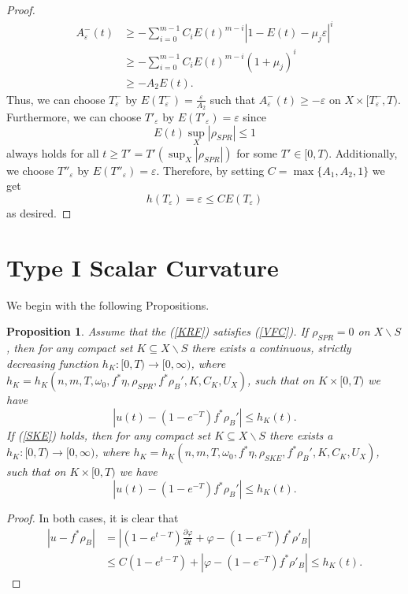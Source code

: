 \documentclass[12pt]{article}
\newtheorem{proposition}[theorem]{Proposition}
\numberwithin{equation}{section}
\renewcommand{\d}{\partial}
\newcommand{\e}{\varepsilon}
\begin{document}
\begin{proof}
\begin{align*}
    A_{\e}^{-}(t) & \geq -\sum_{i=0}^{m-1} C_i E(t)^{m-i}|1-E(t)-\mu_j\e|^i\\
    &\geq - \sum_{i=0}^{m-1} C_i E(t)^{m-i} (1+\mu_j)^i\\
    &\geq - A_2 E(t).
\end{align*}
Thus, we can choose $T^-_{\e}$ by $E(T^-_{\e}) = \frac{\e}{A_2}$ such that $A^-_{\e}(t) \geq -\e$ on $X \times [T^-_{\e},T)$.\\
Furthermore, we can choose $T'_{\e}$ by $E(T'_{\e}) = \e$ since
\begin{equation*}
    E(t) \sup_{X} |\rho_{SPR}| \leq 1
\end{equation*}
always holds for all $t \geq T' = T'(\sup_X|\rho_{SPR}|)$ for some $T' \in [0,T)$. Additionally, we choose $T''_{\e}$ by $E(T''_{\e}) = \e$. Therefore, by setting $C = \max\{A_1,A_2,1\}$ we get
\begin{equation*}
    h(T_\e) = \e \leq C E(T_\e)
\end{equation*}
as desired.
\end{proof}

\section{Type I Scalar Curvature}

\noindent We begin with the following Propositions.

\begin{proposition}
Assume that the (\ref{KRF}) satisfies (\ref{VFC}). If $\rho_{SPR} = 0$ on $X \backslash S$, then for any compact set $K \subseteq X \backslash S$ there exists a continuous, strictly decreasing function $h_K:[0,T) \to [0,\infty)$, where $h_K = h_K(n,m,T,\omega_0,f^*\eta, \rho_{SPR}, f^*\rho_B', K, C_K,U_X)$, such that on $K \times [0,T)$ we have
\begin{equation*}
    \left|u(t) - (1-e^{-T}) f^*\rho_B'\right| \leq h_K(t).
\end{equation*}
If (\ref{SKE}) holds, then for any compact set $K \subseteq X \backslash S$ there exists a $h_K:[0,T) \to [0,\infty)$, where $h_K = h_K(n,m,T,\omega_0,f^*\eta, \rho_{SKE}, f^*\rho_B', K, C_K,U_X)$, such that on $K \times [0,T)$ we have
\begin{equation*}
    \left|u(t) - (1-e^{-T}) f^*\rho_B'\right| \leq h_K(t).
\end{equation*}
\end{proposition}

\begin{proof}
In both cases, it is clear that
\begin{align*}
    |u - f^*\rho_B| &= \left|(1-e^{t-T}) \frac{\d \varphi}{\d t} + \varphi - (1-e^{-T})f^*\rho'_B\right|\\
    &\leq  C (1-e^{t-T}) + |\varphi-(1-e^{-T})f^*\rho'_B| \leq h_K(t).
\end{align*}
\end{proof}
\end{document}
